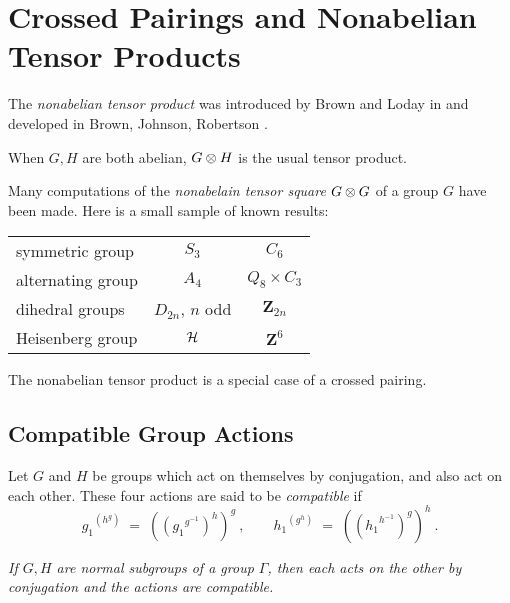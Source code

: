 

\section{Crossed Pairings and Nonabelian Tensor Products} \label{sect:natp}

The \emph{nonabelian tensor product} 
 
was introduced by Brown and Loday in \cite{brow:lod}
and developed in Brown, Johnson, Robertson \cite{brow:jo:ro}.

When  $G,H$  are both abelian,  $G \otimes H$  is the usual tensor product.

Many computations of the \emph{nonabelain tensor square} 
$G \otimes G$  of a group  $G$  have been made.
Here is a small sample of known results:

\begin{center}
\begin{tabular}{|l|c|c|}
\hline
symmetric group        &  $S_3$              &  $C_6$              \\
alternating group      &  $A_4$              &  $Q_8 \times C_3$   \\
dihedral groups        &  $D_{2n}$, $n$ odd  &  $\mathbf{Z}_{2n}$  \\
Heisenberg group       &  $\mathcal{H}$            &  ${\mathbf Z}^6$    \\
\hline
\end{tabular}
\end{center}

The nonabelian tensor product is a special case of a crossed pairing.

\subsection{Compatible Group Actions}

\begin{defn}
Let  $G$  and  $H$  be groups which act on themselves by conjugation, 
and also act on each other.  
These four actions are said to be \emph{compatible} if
$$
{g_1}^{(h^g)} \;=\; (({g_1}^{g^{-1}})^h)^g~, \qquad
{h_1}^{(g^h)} \;=\; (({h_1}^{h^{-1}})^g)^h~.
$$
\end{defn}

\begin{example}
\emph{If $G,H$ are normal subgroups of a group $\Gamma$, then each acts on the 
other by conjugation and the actions are compatible.}
\end{example}

